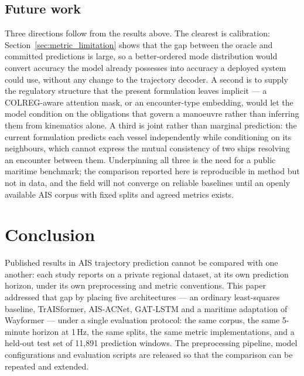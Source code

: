 \documentclass[12pt, a4paper]{article}
\begin{document}
  \subsection{Future work}

  Three directions follow from the results above.  The clearest is calibration:
  Section~\ref{sec:metric_limitation} shows that the gap between the oracle and
  committed predictions is large, so a better-ordered mode distribution would
  convert accuracy the model already possesses into accuracy a deployed system
  could use, without any change to the trajectory decoder.  A second is to supply
  the regulatory structure that the present formulation leaves implicit --- a
  COLREG-aware attention mask, or an encounter-type embedding, would let the
  model condition on the obligations that govern a manoeuvre rather than
  inferring them from kinematics alone.  A third is joint rather than marginal
  prediction: the current formulation predicts each vessel independently while
  conditioning on its neighbours, which cannot express the mutual consistency of
  two ships resolving an encounter between them.  Underpinning all three is the
  need for a public maritime benchmark; the comparison reported here is
  reproducible in method but not in data, and the field will not converge on
  reliable baselines until an openly available AIS corpus with fixed splits and
  agreed metrics exists.

  \section{Conclusion}
  \label{sec:conclusion}

  Published results in AIS trajectory prediction cannot be compared with one
  another: each study reports on a private regional dataset, at its own
  prediction horizon, under its own preprocessing and metric conventions.  This
  paper addressed that gap by placing five architectures --- an ordinary
  least-squares baseline, TrAISformer, AIS-ACNet, GAT-LSTM and a maritime
  adaptation of Wayformer --- under a single evaluation protocol: the same corpus,
  the same 5-minute horizon at 1\,Hz, the same splits, the same metric
  implementations, and a held-out test set of 11{,}891 prediction windows.  The
  preprocessing pipeline, model configurations and evaluation scripts are
  released so that the comparison can be repeated and extended.
\end{document}
